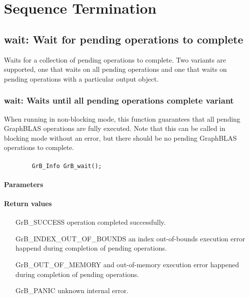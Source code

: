 \section{Sequence Termination}

\subsection{{\sf wait}: Wait for pending operations to complete}

Waits for a collection of pending operations to complete. Two variants are supported, one that
waits on all pending operations and one that waits on pending operations with a particular output object.

\subsubsection{{\sf wait}: Waits until all pending operations complete variant}
\label{Sec:GrB_wait}

When running in non-blocking mode, this function guarantees that all pending GraphBLAS operations are fully executed.  Note that this can be called in blocking mode without an error, but there should be no pending GraphBLAS operations to complete.

\paragraph{\syntax}

\begin{verbatim}
        GrB_Info GrB_wait();
\end{verbatim}

\paragraph{Parameters}

\paragraph{Return values}
\begin{itemize}[leftmargin=2.1in]
	\item[{\sf GrB\_SUCCESS}]	operation completed successfully.
	\item[{\sf GrB\_INDEX\_OUT\_OF\_BOUNDS}]	an index out-of-bounds execution error happend during completion of pending operations.
	\item[{\sf GrB\_OUT\_OF\_MEMORY}]		and out-of-memory execution error happened during completion of pending operations.
	\item[{\sf GrB\_PANIC}]		unknown internal error.
\end{itemize}

